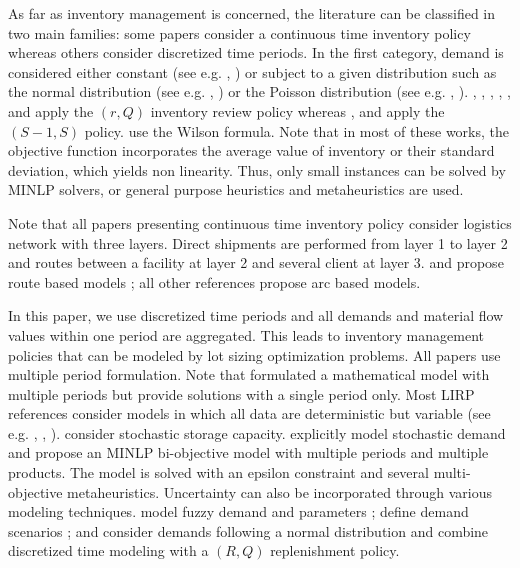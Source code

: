\documentclass[a4paper,10pt]{article}
\begin{document}
\begin{linenumbers}
As far as inventory management is concerned, the literature can be classified in two main families: 
some papers consider a continuous time inventory policy whereas others consider discretized time periods. 
In the first category, demand is considered either constant (see e.g. \cite{AhmSed2012}, \cite{Deng2016})
or subject to a given distribution such as the normal distribution (see e.g. \cite{Zhalechian2016}, \cite{Saragih2018}) or 
the Poisson distribution (see e.g. \cite{Asadi2018}, \cite{HabibiAS2018}). 
\cite{AhmadiJavid2010}, \cite{AhmSed2012}, \cite{Seyedhosseini2014}, \cite{LiuChenLiLiu2015}, \cite{Tang2016}, \cite{Deng2016} and  \cite{Saragih2018} apply the $(r,Q)$ inventory review policy whereas \cite{Dehghani2017}, \cite{HabibiAS2018} and \cite{Asadi2018} apply the $(S-1,S)$ policy. \cite{Yuchi2016} use the Wilson formula. 
Note that in  most of these works, the objective function incorporates the average value of inventory or their standard deviation, which yields non linearity. 
Thus, only small instances can be solved by MINLP solvers, or general purpose heuristics and metaheuristics are used. 

Note that all papers presenting continuous time inventory policy consider logistics network with three layers. 
Direct shipments are performed from layer 1 to layer 2 and routes between a facility at layer 2 and several client at layer 3. 
\cite{LiuChenLiLiu2015} and \cite{Deng2016} propose route based models ; all other references propose arc based models. 


In this paper, we use discretized time periods and all demands and material flow values within one period are aggregated. This leads to inventory management policies that can be modeled by lot sizing optimization problems. 
All papers use multiple period formulation. Note that \cite{AmbScu05} formulated a mathematical model with multiple periods but provide solutions with a single period only. 
Most LIRP references consider models in which all data are deterministic but variable (see e.g. \cite{Guerrero2013}, \cite{Zhang2014}, \cite{Ghorbani2016}). 
\cite{Vahdani2018} consider stochastic storage capacity. 
\cite{Rayat2017} explicitly model stochastic demand and propose an MINLP bi-objective model with multiple periods and multiple products. The model is solved with an epsilon constraint and several multi-objective metaheuristics. 
Uncertainty can also be incorporated through various modeling techniques. 
\cite{ChenChenSunLiu2014, TavakkoliIFAC2016, Eskandari2018} model fuzzy demand and parameters ; \cite{Bashiri2018} define demand scenarios ; 
\cite{Zhalechian2016} and \cite{Rafie-Majd2018} consider demands following a normal distribution and combine discretized time modeling with a $(R,Q)$ replenishment policy.  


\end{linenumbers}
\end{document}
